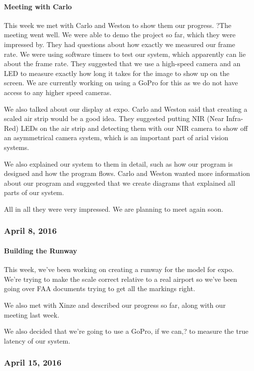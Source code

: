 \paragraph{Meeting with Carlo}
This week we met with Carlo and Weston to show them our progress. ?The meeting went well. We were able to demo the project so far, which they were impressed by. They had questions about how exactly we measured our frame rate. We were using software timers to test our system, which apparently can lie about the frame rate. They suggested that we use a high-speed camera and an LED to measure exactly how long it takes for the image to show up on the screen. We are currently working on using a GoPro for this as we do not have access to any higher speed cameras.
\par
We also talked about our display at expo. Carlo and Weston said that creating a scaled air strip would be a good idea. They suggested putting NIR (Near Infra-Red) LEDs on the air strip and detecting them with our NIR camera to show off an asymmetrical camera system, which is an important part of arial vision systems.
\par
We also explained our system to them in detail, such as how our program is designed and how the program flows. Carlo and Weston wanted more information about our program and suggested that we create diagrams that explained all parts of our system.
\par
All in all they were very impressed. We are planning to meet again soon.\\

\subsubsection{April 8, 2016}
\paragraph{Building the Runway}
This week, we've been working on creating a runway for the model for expo. We're trying to make the scale correct relative to a real airport so we've been going over FAA documents trying to get all the markings right.
\par
We also met with Xinze and described our progress so far, along with our meeting last week.
\par
We also decided that we're going to use a GoPro, if we can,? to measure the true latency of our system.\\

\subsubsection{April 15, 2016}
